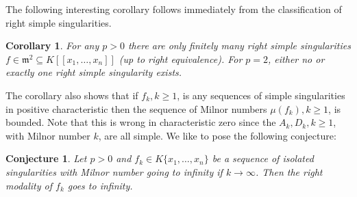 \documentclass[11pt]{article}
\newtheorem{Corollary}[Definition]{Corollary}
\newtheorem{conjecture}[Definition]{Conjecture}
\begin{document}
The following interesting corollary follows immediately from the classification of right simple singularities.

\begin{Corollary}\label{coro1.5.1}
For any $p>0$ there are only finitely many right simple singularities $f\in\mathfrak{m}^2\subseteq K[[x_1,\ldots,x_n]]$ (up to right equivalence). For $p=2$, either no or exactly one right simple singularity exists. 
\end{Corollary}

The corollary also shows that if $f_k,k\geq 1$, is any sequences of simple singularities in positive characteristic then the sequence of Milnor numbers $\mu(f_k),k\geq 1$, is bounded. Note that this is wrong in characteristic zero since the $A_k,D_k,k\geq 1$, with Milnor number $k$, are all simple. We like to pose the following conjecture:

\begin{conjecture}\label{conj:rightmodality}
Let $p>0$ and $f_k\in K\{x_1,\ldots,x_n\}$ be a sequence of isolated singularities with Milnor number going to infinity if $k\to \infty$. Then the right modality of $f_k$ goes to infinity. 
\end{conjecture}
\end{document}
